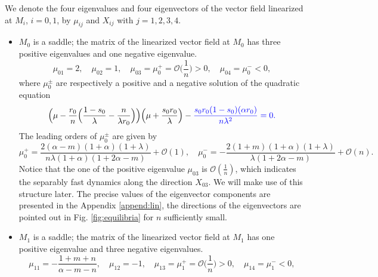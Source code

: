 \documentclass[a4paper,11pt]{article}
\def\blue{\color{blue}}
\def\BO{{\mathcal{O}}}
\theoremstyle{remark}
\begin{document}
{\blue We denote the four eigenvalues and four eigenvectors of the vector field linearized at} $M_i$, $i=0,1$,  by $\mu_{ij}$ and $X_{ij}$ with $j=1,2,3,4$. %
\begin{itemize}
 \item $M_0$ is a saddle; {\blue the matrix of the linearized vector field at $M_0$} has three positive eigenvalues and one negative eigenvalue. 
 \begin{equation} \label{eq:eigM0}
  \mu_{01} = 2, \quad \mu_{02}=1, \quad \mu_{03}=\mu_0^+=\BO\Big(\frac{1}{n}\Big)>0, \quad \mu_{04}=\mu_0^{-}<0,
 \end{equation}
  where $\mu_0^\pm$ are respectively a positive and a negative solution of the quadratic equation
 $$ \Big(\mu - \frac{r_0}{n}\Big(\frac{1-s_0}{\lambda}-\frac{n}{\lambda r_0}\Big)\Big)\Big(\mu + \frac{s_0r_0}{\lambda}\Big) -
 {\blue \frac{s_0r_0(1-s_0)(\alpha r_0)}{n\lambda^2} = 0.}$$%
The leading orders of $\mu_0^\pm$ are given by
{\blue $$\mu_0^+ = \frac{2(\alpha-m)(1+\alpha)(1+\lambda)}{n\lambda(1+\alpha)(1+2\alpha-m)}+\BO(1), \quad\mu_0^- = -\frac{2(1+m)(1+\alpha)(1+\lambda)}{\lambda(1+2\alpha-m)}  + \BO(n).$$}
Notice that the one of the positive eigenvalue $\mu_{03}$ is $\mathcal{O}( \frac{1}{n})$, which indicates the separably fast dynamics along the direction $X_{03}$. We will make use of this structure later.
The precise values of the eigenvector components are presented in the Appendix \ref{append:lin}, the directions of the eigenvectors are
pointed out in Fig. \ref{fig:equilibria} for $n$ sufficiently small.
 \item $M_1$ is a saddle; {\blue the matrix of the linearized vector field at $M_1$} has one positive eigenvalue and three negative eigenvalues. 
\begin{equation} \label{eq:eigM1}
 \mu_{11}=-\frac{1+m+n}{\alpha-m-n}, \quad \mu_{12}=-1, \quad \mu_{13}=\mu_1^+=\BO\Big(\frac{1}{n}\Big)>0, \quad \mu_{14}=\mu_1^{-}<0,

\end{equation}
\end{itemize}
\end{document}
